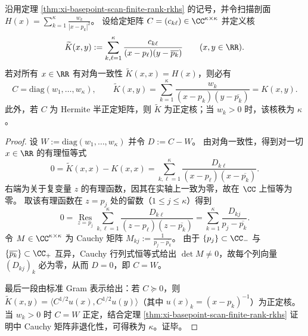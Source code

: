 \begin{proposition}\label{prop:xi-basepoint-scan-kernel-uniqueness}
沿用定理 \ref{thm:xi-basepoint-scan-finite-rank-rkhs} 的记号，并令扫描剖面
\(
H(x)=\sum_{k=1}^{\kappa}\frac{w_k}{|x-p_k|^2}
\)。
设给定矩阵 \(C=(c_{k\ell})\in\CC^{\kappa\times\kappa}\) 并定义核
\[
\widetilde K(x,y):=\sum_{k,\ell=1}^{\kappa}\frac{c_{k\ell}}{(x-p_\ell)(y-\overline{p_k})}\qquad(x,y\in\RR).
\]
若对所有 \(x\in\RR\) 有对角一致性 \(\widetilde K(x,x)=H(x)\)，则必有
\[
C=\mathrm{diag}(w_1,\dots,w_\kappa),
\qquad
\widetilde K(x,y)=\sum_{k=1}^{\kappa}\frac{w_k}{(x-p_k)(y-\overline{p_k})}=K(x,y).
\]
此外，若 \(C\) 为 Hermite 半正定矩阵，则 \(\widetilde K\) 为正定核；当 \(w_k>0\) 时，该核秩为 \(\kappa\)。
\end{proposition}
\begin{proof}
设 \(W:=\mathrm{diag}(w_1,\dots,w_\kappa)\) 并令 \(D:=C-W\)。
由对角一致性，得到对一切 \(x\in\RR\) 的有理恒等式
\[
0=\widetilde K(x,x)-K(x,x)
=\sum_{k,\ell=1}^{\kappa}\frac{D_{k\ell}}{(x-p_\ell)(x-\overline{p_k})}.
\]
右端为关于复变量 \(z\) 的有理函数，因其在实轴上一致为零，故在 \(\CC\) 上恒等为零。
取该有理函数在 \(z=p_j\) 处的留数（\(1\le j\le \kappa\)）得到
\[
0=\operatorname*{Res}_{z=p_j}\sum_{k,\ell=1}^{\kappa}\frac{D_{k\ell}}{(z-p_\ell)(z-\overline{p_k})}
=\sum_{k=1}^{\kappa}\frac{D_{kj}}{p_j-\overline{p_k}}.
\]
令 \(M\in\CC^{\kappa\times\kappa}\) 为 Cauchy 矩阵 \(M_{kj}:=\frac{1}{p_j-\overline{p_k}}\)。
由于 \(\{p_j\}\subset\CC_{-}\) 与 \(\{\overline{p_k}\}\subset\CC_{+}\) 互异，Cauchy 行列式恒等式给出 \(\det M\ne 0\)，故每个列向量 \((D_{kj})_{k}\) 必为零，从而 \(D=0\)，即 \(C=W\)。
\par
最后一段由标准 Gram 表示给出：若 \(C\succeq 0\)，则 \(\widetilde K(x,y)=\langle C^{1/2}u(x),C^{1/2}u(y)\rangle\)（其中 \(u(x)_k=(x-p_k)^{-1}\)）为正定核。
当 \(w_k>0\) 时 \(C=W\) 正定，结合定理 \ref{thm:xi-basepoint-scan-finite-rank-rkhs} 证明中 Cauchy 矩阵非退化性，可得秩为 \(\kappa\)。证毕。
\end{proof}

